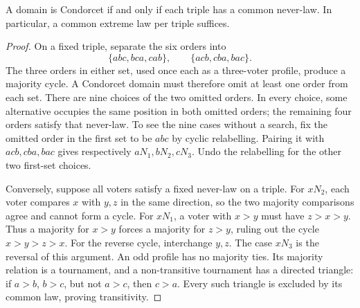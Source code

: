 \begin{theorem}\label{thm:triple}
A domain is Condorcet if and only if each triple has a common never-law.
In particular, a common extreme law per triple suffices.
\end{theorem}
\begin{proof}
On a fixed triple, separate the six orders into
\[
 \{abc,bca,cab\},\qquad\{acb,cba,bac\}.
\]
The three orders in either set, used once each as a three-voter profile,
produce a majority cycle. A Condorcet domain must therefore omit at
least one order from each set. There are nine choices of the two
omitted orders. In every choice, some alternative occupies the same
position in both omitted orders; the remaining four orders satisfy
that never-law. To see the nine cases without a search, fix the omitted
order in the first set to be \(abc\) by cyclic relabelling. Pairing
it with \(acb,cba,bac\) gives respectively \(aN_1,bN_2,cN_3\).
Undo the relabelling for the other two first-set choices.

Conversely, suppose all voters satisfy a fixed never-law on a triple.
For \(xN_2\), each voter compares \(x\) with \(y,z\) in the same
direction, so the two majority comparisons agree and cannot form a
cycle. For \(xN_1\), a voter with \(x>y\) must have \(z>x>y\).
Thus a majority for \(x>y\) forces a majority for \(z>y\), ruling
out the cycle \(x>y>z>x\). For the reverse cycle, interchange \(y,z\).
The case \(xN_3\) is the reversal of this argument.
An odd profile has no majority ties. Its majority relation is a
tournament, and a non-transitive tournament has a directed triangle:
if \(a>b\), \(b>c\), but not \(a>c\), then \(c>a\). Every such
triangle is excluded by its common law, proving transitivity.
\end{proof}

